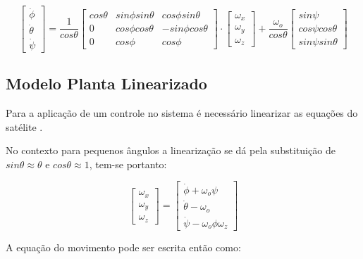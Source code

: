 \begin{equation}
	\begin{bmatrix}
		\dot{\phi}  \\
		\dot{\theta} \\
		\dot{\psi}
\end{bmatrix} = \frac{1}{cos\theta}
\begin{bmatrix}
	cos\theta & sin\phi sin\theta & cos\phi sin\theta \\
	0 & cos\phi cos\theta & -sin\phi cos\theta \\
	0 & cos\phi & cos\phi
\end{bmatrix} \cdot
 \begin{bmatrix}
 	\omega_x\\
 	\omega_y\\
 	\omega_z
 \end{bmatrix} + \frac{\omega_o}{cos\theta}
 \begin{bmatrix}
 	sin\psi  \\
 	cos\psi cos\theta \\
 	sin\psi sin\theta
 \end{bmatrix}
\end{equation}

\subsection{Modelo Planta Linearizado}\label{sec:3.1.3.}

Para a aplicação de um controle no sistema é necessário linearizar as equações do satélite .

No contexto para pequenos ângulos a linearização se dá pela substituição de $sin\theta\approx\theta$ e $cos\theta\approx1$, tem-se portanto:

\begin{equation}
\begin{bmatrix} \omega_x \\
				\omega_y \\
				\omega_z
\end{bmatrix}
=
\begin{bmatrix} \dot{\phi}+\omega_o\psi \\
	            \dot{\theta}-\omega_o \\
	            \dot{\psi}-\omega_o\phi \omega_z
\end{bmatrix}  
\end{equation}

A equação do movimento pode ser escrita então como:

